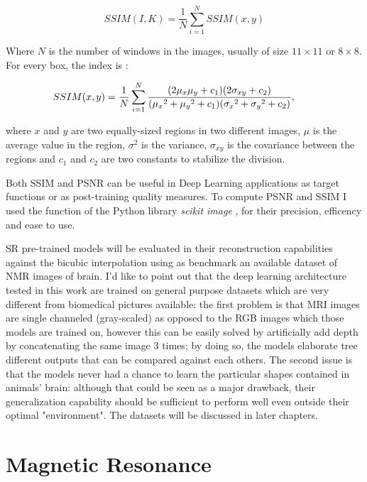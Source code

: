 \documentclass[12pt,a4paper]{report}
\begin{document}
\begin{equation}
 SSIM(I, K) = \frac{1}{N} \sum_{i=1}^{N} SSIM(x, y)
\end{equation}

Where $N$ is the number of windows in the images, usually of size $11 \times 11$ or $8 \times 8$. For every box, the index is : 

 \begin{equation}
    \hspace{-0.75cm}
    SSIM(x, y) = \frac{1}{N}\sum_{i=1}^{N} \frac{(2\mu_x\mu_y + c_1)(2\sigma_{xy} + c_2)}{ ({\mu_x}^2 + {\mu_y}^2 + c_1)({\sigma_x}^2 + {\sigma_y}^2 + c_2) },
    \label{SSIM}
\end{equation}

where $x$ and $y$ are two equally-sized regions in two different images, $\mu$ is the average value in the region, $\sigma^2$ is the variance, $\sigma_{xy}$ is the covariance between the regions and $c_1$ and $c_2$ are two constants to stabilize the division.

Both SSIM and PSNR can be useful in Deep Learning applications as target functions or as post-training quality measures. 
To compute PSNR and SSIM I used the function of the Python library {\it scikit image} \cite{scikit}, for their precision, efficency and ease to use.

SR pre-trained models will be evaluated in their reconstruction capabilities against the bicubic interpolation using as benchmark an available dataset of NMR images of brain. 
I'd like to point out that the deep learning architecture tested in this work are trained  on general purpose datasets which are very different from biomedical pictures available:  the first problem is that MRI images are single channeled (gray-scaled) as opposed to the RGB images which those models are trained on, however this can be easily solved by artificially add depth by concatenating the same image 3 times; by doing so, the models elaborate tree different outputs that can be compared against each others.  
The second issue is that the models never had a chance to learn the particular shapes contained in animals' brain: although that could be seen as a major drawback, their generalization capability should be sufficient to perform well even outside their optimal "environment". 
The datasets will be discussed in later chapters.

\section{Magnetic Resonance}
\end{document}
